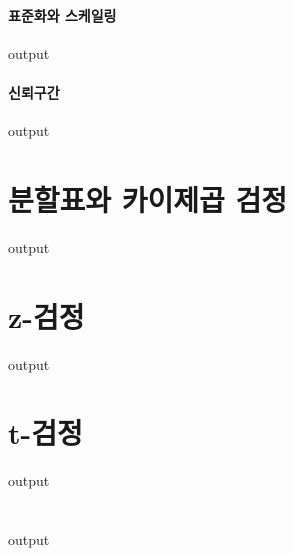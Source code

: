 \documentclass{report}
\begin{document}
\paragraph{표준화와 스케일링}
\begin{Schunk}
\begin{Soutput}
output
\end{Soutput}
\end{Schunk}

\paragraph{신뢰구간}
\begin{Schunk}
\begin{Soutput}
output
\end{Soutput}
\end{Schunk}

\section{분할표와 카이제곱 검정}
\begin{Schunk}
\begin{Soutput}
output
\end{Soutput}
\end{Schunk}

\section{z-검정}
\begin{Schunk}
\begin{Soutput}
output
\end{Soutput}
\end{Schunk}

\section{t-검정}
\begin{Schunk}
\begin{Soutput}
output
\end{Soutput}
\end{Schunk}

\section{}
\begin{Schunk}
\begin{Soutput}
output
\end{Soutput}
\end{Schunk}
\end{document}
